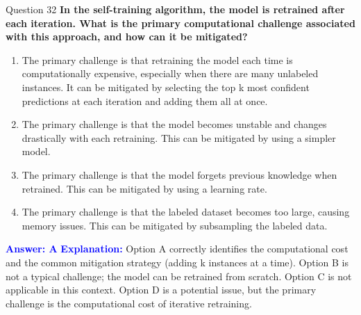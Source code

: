 \documentclass{beamer}
\begin{document}
	\begin{frame}{Question 32}
		\textbf{In the self-training algorithm, the model is retrained after each iteration. What is the primary computational challenge associated with this approach, and how can it be mitigated?}
		\begin{enumerate}
			\item The primary challenge is that retraining the model each time is computationally expensive, especially when there are many unlabeled instances. It can be mitigated by selecting the top k most confident predictions at each iteration and adding them all at once.
			\item The primary challenge is that the model becomes unstable and changes drastically with each retraining. This can be mitigated by using a simpler model.
			\item The primary challenge is that the model forgets previous knowledge when retrained. This can be mitigated by using a learning rate.
			\item The primary challenge is that the labeled dataset becomes too large, causing memory issues. This can be mitigated by subsampling the labeled data.
		\end{enumerate}
		\vspace{0.2cm}
		\textcolor{blue}{\textbf{Answer: A}}
		\vspace{0.2cm}
		\textcolor{blue}{\textbf{Explanation:}} Option A correctly identifies the computational cost and the common mitigation strategy (adding k instances at a time). Option B is not a typical challenge; the model can be retrained from scratch. Option C is not applicable in this context. Option D is a potential issue, but the primary challenge is the computational cost of iterative retraining.
	\end{frame}
	
\end{document}
